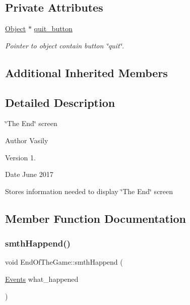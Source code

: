 \subsection*{Private Attributes}
\begin{DoxyCompactItemize}
\item 
\mbox{\label{class_end_of_the_game_af4d60352787faf883df1eec46183eee9}} 
\hyperlink{class_object}{Object} $\ast$ \hyperlink{class_end_of_the_game_af4d60352787faf883df1eec46183eee9}{quit\+\_\+button}
\begin{DoxyCompactList}\small\item\em Pointer to object contain button \char`\"{}quit\char`\"{}. \end{DoxyCompactList}\end{DoxyCompactItemize}
\subsection*{Additional Inherited Members}


\subsection{Detailed Description}
\char`\"{}\+The End\char`\"{} screen 

\begin{DoxyAuthor}{Author}
Vasily 
\end{DoxyAuthor}
\begin{DoxyVersion}{Version}
1. 
\end{DoxyVersion}
\begin{DoxyDate}{Date}
June 2017
\end{DoxyDate}
Stores information needed to display \char`\"{}\+The End\char`\"{} screen 

\subsection{Member Function Documentation}
\mbox{\label{class_end_of_the_game_a88ac00a6aaa5193c7642d9ea2c6be688}} 
\subsubsection{\texorpdfstring{smth\+Happend()}{smthHappend()}}
{\footnotesize\ttfamily void End\+Of\+The\+Game\+::smth\+Happend (\begin{DoxyParamCaption}\item[{\hyperlink{_events_8h_af60e00b78607064c5be6aa9397ea49c1}{Events}}]{what\+\_\+happened }\end{DoxyParamCaption})\hspace{0.3cm}{\ttfamily [virtual]}}



